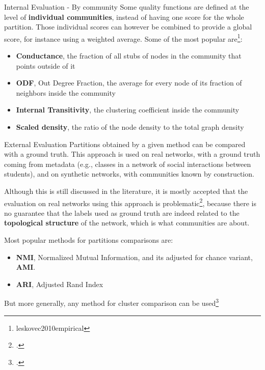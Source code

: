 \begin{textbox}{Internal Evaluation - By community}
    Some quality functions are defined at the level of \textbf{individual communities}, instead of having one score for the whole partition. Those individual scores can however be combined to provide a global score, for instance using a weighted average. Some of the most popular are\footnote{leskovec2010empirical}:
    \begin{itemize}
        \item \textbf{Conductance}, the fraction of all stubs of nodes in the community that points outside of it
        \item \textbf{ODF}, Out Degree Fraction, the average for every node of its fraction of neighbors inside the community
        \item \textbf{Internal Transitivity}, the clustering coefficient inside the community
        \item \textbf{Scaled density}, the ratio of the node density to the total graph density
    \end{itemize}
\end{textbox}


\begin{textbox}{External Evaluation}
    Partitions obtained by a given method can be compared with a ground truth. This approach is used on real networks, with a ground truth coming from metadata (e.g., classes in a network of social interactions between students), and on synthetic networks, with communities known by construction.

    Although this is still discussed in the literature, it is mostly accepted that the evaluation on real networks using this approach is problematic\footcite{peel2017ground}, because there is no guarantee that the labels used as ground truth are indeed related to the \textbf{topological structure} of the network, which is what communities are about.

    Most popular methods for partitions comparisons are:
    \begin{itemize}
        \item \textbf{NMI}, Normalized Mutual Information, and its adjusted for chance variant, \textbf{AMI}.
        \item \textbf{ARI}, Adjusted Rand Index
    \end{itemize}
    But more generally, any method for cluster comparison can be used\footcite{dao2020community}
\end{textbox}


